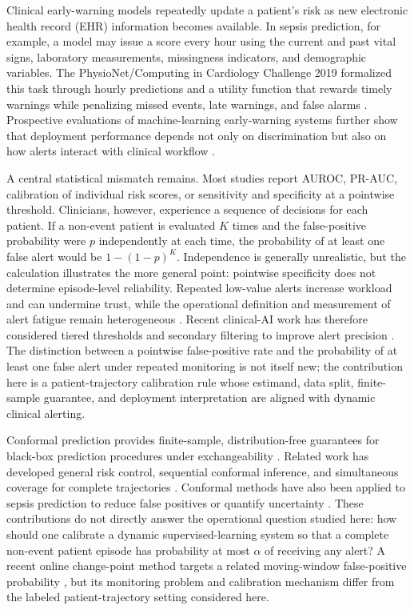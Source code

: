 \documentclass[11pt]{article}
\begin{document}
Clinical early-warning models repeatedly update a patient's risk as new electronic health record (EHR) information becomes available. In sepsis prediction, for example, a model may issue a score every hour using the current and past vital signs, laboratory measurements, missingness indicators, and demographic variables. The PhysioNet/Computing in Cardiology Challenge 2019 formalized this task through hourly predictions and a utility function that rewards timely warnings while penalizing missed events, late warnings, and false alarms \citep{reyna2019physionet,reyna2020early}. Prospective evaluations of machine-learning early-warning systems further show that deployment performance depends not only on discrimination but also on how alerts interact with clinical workflow \citep{adams2022prospective,henry2022factors}.

A central statistical mismatch remains. Most studies report AUROC, PR-AUC, calibration of individual risk scores, or sensitivity and specificity at a pointwise threshold. Clinicians, however, experience a sequence of decisions for each patient. If a non-event patient is evaluated $K$ times and the false-positive probability were $p$ independently at each time, the probability of at least one false alert would be $1-(1-p)^K$. Independence is generally unrealistic, but the calculation illustrates the more general point: pointwise specificity does not determine episode-level reliability. Repeated low-value alerts increase workload and can undermine trust, while the operational definition and measurement of alert fatigue remain heterogeneous \citep{ray2026alert}. Recent clinical-AI work has therefore considered tiered thresholds and secondary filtering to improve alert precision \citep{wu2026tiered}. The distinction between a pointwise false-positive rate and the probability of at least one false alert under repeated monitoring is not itself new; the contribution here is a patient-trajectory calibration rule whose estimand, data split, finite-sample guarantee, and deployment interpretation are aligned with dynamic clinical alerting.

Conformal prediction provides finite-sample, distribution-free guarantees for black-box prediction procedures under exchangeability \citep{vovk2005algorithmic,lei2018distribution,angelopoulos2023gentle}. Related work has developed general risk control, sequential conformal inference, and simultaneous coverage for complete trajectories \citep{bates2021distribution,angelopoulos2024conformal,xu2023sequential,zhou2024conformalized}. Conformal methods have also been applied to sepsis prediction to reduce false positives or quantify uncertainty \citep{dalal2025timeseries}. These contributions do not directly answer the operational question studied here: how should one calibrate a dynamic supervised-learning system so that a complete non-event patient episode has probability at most $\alpha$ of receiving any alert? A recent online change-point method targets a related moving-window false-positive probability \citep{martin2026sequential}, but its monitoring problem and calibration mechanism differ from the labeled patient-trajectory setting considered here.
\end{document}
